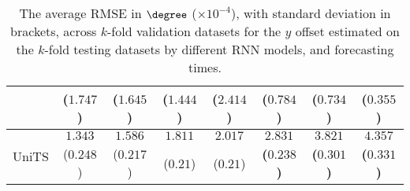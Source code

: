 \begin{table}[!ht]
{\begin{tabular}{|c|c|c|c|c|c|c|c|}
			 & ($1.747$) & ($1.645$) & ($1.444$) & ($2.414$) & ($0.784$) & ($0.734$) & ($0.355$) \\ \hline
			\multirow{2}{*}{UniTS} & $1.343$ & $1.586$ & $1.811$ & $2.017$ & $\mathbf{2.831}$ & $\mathbf{3.821}$ & $\mathbf{4.357}$ \\
			 & ($0.248$) & ($0.217$) & ($0.21$) & ($0.21$) & \textbf{(}$\mathbf{0.238}$\textbf{)} & \textbf{(}$\mathbf{0.301}$\textbf{)} & \textbf{(}$\mathbf{0.331}$\textbf{)} \\ \hline
		\end{tabular}
	}
	\caption{The average RMSE in $\degree$ ($\times 10^{-4}$), with standard deviation in brackets, across $k$-fold validation datasets for the $y$ offset estimated on the $k$-fold testing datasets by different RNN models, and forecasting times.}
	\label{tab:all_latitude_no_abs_RMSE}
\end{table}